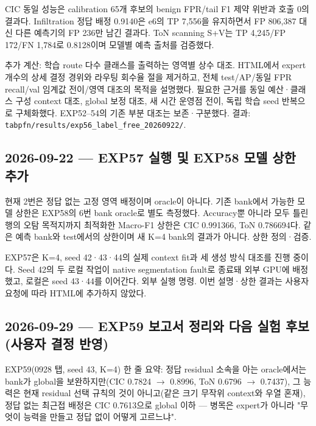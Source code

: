 CIC 동일 성능은 calibration 65개 후보의 benign FPR/\allowbreak{}tail F1 제약 위반과 호출 0의 결과다. Infiltration 정답 배정 0.9140은 e6의 TP 7,556을 유지하면서 FP 806,387 대신 다른 예측기의 FP 236만 남긴 결과다. ToN scanning S+\allowbreak{}V는 TP 4,245/\allowbreak{}FP 172/\allowbreak{}FN 1,784로 0.8128이며 모델별 예측 출처를 검증했다.

추가 계산: 학습 route 다수 클래스를 출력하는 영역별 상수 대조. HTML에서 expert 개수의 상세 결정 경위와 라우팅 회수율 절을 제거하고, 전체 test/\allowbreak{}AP/\allowbreak{}동일 FPR recall/\allowbreak{}val 임계값 전이/\allowbreak{}영역 대조의 목적을 설명했다. 필요한 근거를 동일 예산·클래스 구성 context 대조, global 보정 대조, 새 시간 운영점 전이, 독립 학습 seed 반복으로 구체화했다. EXP52–54의 기존 부분 대조는 보존·구분했다. 결과: \texttt{tabpfn/\allowbreak{}\allowbreak{}r\allowbreak{}esults/\allowbreak{}\allowbreak{}e\allowbreak{}xp56\_\allowbreak{}\allowbreak{}lab\allowbreak{}el\_\allowbreak{}\allowbreak{}free\_\allowbreak{}\allowbreak{}20260922\allowbreak{}/\allowbreak{}\allowbreak{}}.

\subsection{2026-09-22 — EXP57 실행 및 EXP58 모델 상한 추가}
현재 2번은 정답 없는 고정 영역 배정이며 oracle이 아니다. 기존 bank에서 가능한 모델 상한은 EXP58의 6번 bank oracle로 별도 측정했다. Accuracy뿐 아니라 모두 틀린 행의 오탐 목적지까지 최적화한 Macro-F1 상한은 CIC 0.991366, ToN 0.786694다. 같은 예측 bank와 test에서의 상한이며 새 K=\allowbreak{}4 bank의 결과가 아니다. 상한 정의·검증.

EXP57은 K=\allowbreak{}4, seed 42·43·44의 실제 context fit과 세 생성 방식 대조를 진행 중이다. Seed 42의 두 로컬 작업이 native segmentation fault로 종료돼 외부 GPU에 배정했고, 로컬은 seed 43·44를 이어간다. 외부 실행 명령. 이번 설명·상한 결과는 사용자 요청에 따라 HTML에 추가하지 않았다.

\subsection{2026-09-29 — EXP59 보고서 정리와 다음 실험 후보 (사용자 결정 반영)}
EXP59(0928 탭, seed 43, K=\allowbreak{}4) 한 줄 요약: 정답 residual 소속을 아는 oracle에서는 bank가 global을 보완하지만(CIC 0.7824 \ensuremath{\rightarrow} 0.8996, ToN 0.6796 \ensuremath{\rightarrow} 0.7437), 그 능력은 현재 residual 선택 규칙의 것이 아니고(같은 크기 무작위 context와 우열 혼재), 정답 없는 최근접 배정은 CIC 0.7613으로 global 이하 — 병목은 expert가 아니라 "무엇이 능력을 만들고 정답 없이 어떻게 고르느냐".

